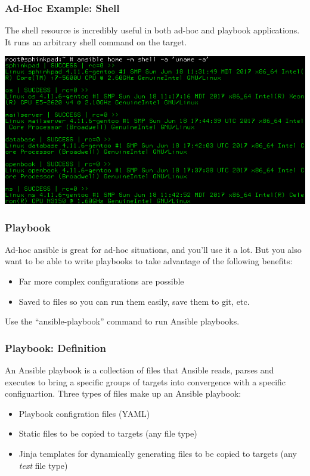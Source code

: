 \documentclass[helvetica,english,utf8,notitle,nologo]{beamer}
\begin{document}
\begin{frame}
  \frametitle{Ad-Hoc Example: Shell}

  The shell resource is incredibly useful in both ad-hoc and playbook
  applications. It runs an arbitrary shell command on the target.

  \includegraphics[scale=0.44]{img_5}
\end{frame}

\begin{frame}
  \frametitle{Playbook}

  Ad-hoc ansible is great for ad-hoc situations, and you'll use it a
  lot. But you also want to be able to write playbooks to take
  advantage of the following benefits:

  \begin{itemize}
  \item Far more complex configurations are possible
  \item Saved to files so you can run them easily, save them to git,
    etc.
  \end{itemize}

  Use the ``ansible-playbook'' command to run Ansible playbooks.
\end{frame}

\begin{frame}
  \frametitle{Playbook: Definition}

  An Ansible playbook is a collection of files that Ansible reads,
  parses and executes to bring a specific groups of targets into
  convergence with a specific configuartion. Three types of files make
  up an Ansible playbook:

  \begin{itemize}
  \item Playbook configration files (YAML)
  \item Static files to be copied to targets (any file type)
  \item Jinja templates for dynamically generating files to be copied
    to targets (any \textit{text} file type)
  \end{itemize}
\end{frame}
\end{document}
